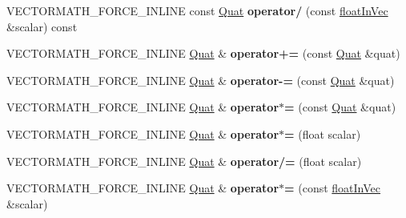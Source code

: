 \begin{DoxyCompactItemize}
V\+E\+C\+T\+O\+R\+M\+A\+T\+H\+\_\+\+F\+O\+R\+C\+E\+\_\+\+I\+N\+L\+I\+NE const \hyperlink{classVectormath_1_1Aos_1_1Quat}{Quat} {\bfseries operator/} (const \hyperlink{classVectormath_1_1floatInVec}{float\+In\+Vec} \&scalar) const
\item 
\mbox{\label{classVectormath_1_1Aos_1_1Quat_a9158dc25a79ed436657256b16768ec31}} 
V\+E\+C\+T\+O\+R\+M\+A\+T\+H\+\_\+\+F\+O\+R\+C\+E\+\_\+\+I\+N\+L\+I\+NE \hyperlink{classVectormath_1_1Aos_1_1Quat}{Quat} \& {\bfseries operator+=} (const \hyperlink{classVectormath_1_1Aos_1_1Quat}{Quat} \&quat)
\item 
\mbox{\label{classVectormath_1_1Aos_1_1Quat_a97803eacef896d4cffceda9dc551b43d}} 
V\+E\+C\+T\+O\+R\+M\+A\+T\+H\+\_\+\+F\+O\+R\+C\+E\+\_\+\+I\+N\+L\+I\+NE \hyperlink{classVectormath_1_1Aos_1_1Quat}{Quat} \& {\bfseries operator-\/=} (const \hyperlink{classVectormath_1_1Aos_1_1Quat}{Quat} \&quat)
\item 
\mbox{\label{classVectormath_1_1Aos_1_1Quat_aa3aeb65a6179f1769433b2b1ef3a3586}} 
V\+E\+C\+T\+O\+R\+M\+A\+T\+H\+\_\+\+F\+O\+R\+C\+E\+\_\+\+I\+N\+L\+I\+NE \hyperlink{classVectormath_1_1Aos_1_1Quat}{Quat} \& {\bfseries operator$\ast$=} (const \hyperlink{classVectormath_1_1Aos_1_1Quat}{Quat} \&quat)
\item 
\mbox{\label{classVectormath_1_1Aos_1_1Quat_a5022b6c946c23c00c94e35be02301856}} 
V\+E\+C\+T\+O\+R\+M\+A\+T\+H\+\_\+\+F\+O\+R\+C\+E\+\_\+\+I\+N\+L\+I\+NE \hyperlink{classVectormath_1_1Aos_1_1Quat}{Quat} \& {\bfseries operator$\ast$=} (float scalar)
\item 
\mbox{\label{classVectormath_1_1Aos_1_1Quat_aee82a492d22d88c0a241fe3fbcc4ad16}} 
V\+E\+C\+T\+O\+R\+M\+A\+T\+H\+\_\+\+F\+O\+R\+C\+E\+\_\+\+I\+N\+L\+I\+NE \hyperlink{classVectormath_1_1Aos_1_1Quat}{Quat} \& {\bfseries operator/=} (float scalar)
\item 
\mbox{\label{classVectormath_1_1Aos_1_1Quat_ad2d0ab4553704e04e99661ca959a52ce}} 
V\+E\+C\+T\+O\+R\+M\+A\+T\+H\+\_\+\+F\+O\+R\+C\+E\+\_\+\+I\+N\+L\+I\+NE \hyperlink{classVectormath_1_1Aos_1_1Quat}{Quat} \& {\bfseries operator$\ast$=} (const \hyperlink{classVectormath_1_1floatInVec}{float\+In\+Vec} \&scalar)

\end{DoxyCompactItemize}
